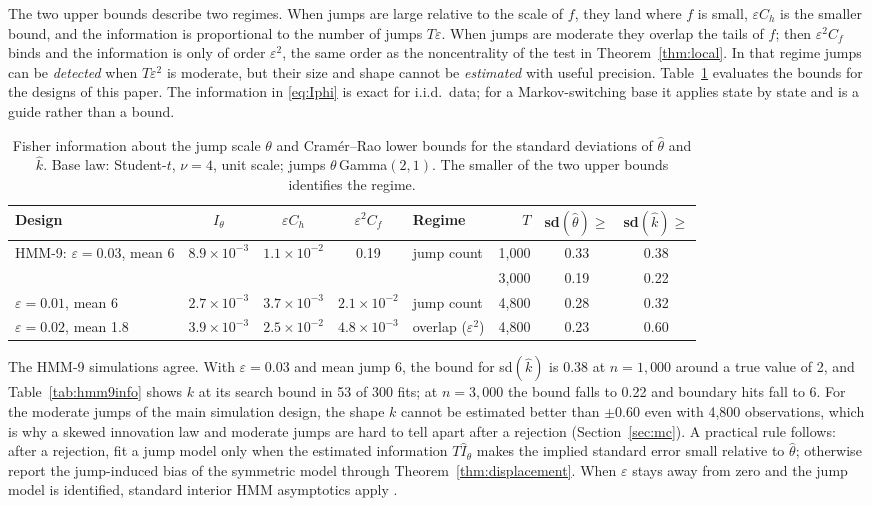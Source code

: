 \documentclass[11pt,a4paper]{article}
\theoremstyle{definition}
\theoremstyle{remark}
\begin{document}
\noindent The two upper bounds describe two regimes. When jumps are large relative to the scale of $f$, they land where $f$ is small, $\varepsilon C_h$ is the smaller bound, and the information is proportional to the number of jumps $T\varepsilon$. When jumps are moderate they overlap the tails of $f$; then $\varepsilon^2C_f$ binds and the information is only of order $\varepsilon^2$, the same order as the noncentrality of the test in Theorem~\ref{thm:local}. In that regime jumps can be \emph{detected} when $T\varepsilon^2$ is moderate, but their size and shape cannot be \emph{estimated} with useful precision. Table~\ref{tab:crb} evaluates the bounds for the designs of this paper. The information in \eqref{eq:Iphi} is exact for i.i.d.\ data; for a Markov-switching base it applies state by state and is a guide rather than a bound.

\begin{table}[ht]\centering\footnotesize\setlength{\tabcolsep}{4pt}
\caption{Fisher information about the jump scale $\theta$ and Cram\'er--Rao lower bounds for the standard deviations of $\hat\theta$ and $\hat k$. Base law: Student-$t$, $\nu=4$, unit scale; jumps $\theta\,$Gamma$(2,1)$. The smaller of the two upper bounds identifies the regime.}\label{tab:crb}
\begin{tabular}{lccclrcc}
\toprule
Design & $I_\theta$ & $\varepsilon C_h$ & $\varepsilon^2C_f$ & Regime & $T$ & sd$(\hat\theta)\ge$ & sd$(\hat k)\ge$\\
\midrule
HMM-9: $\varepsilon=0.03$, mean 6 & $8.9\times10^{-3}$ & $1.1\times10^{-2}$ & 0.19 & jump count & 1{,}000 & 0.33 & 0.38\\
 & & & & & 3{,}000 & 0.19 & 0.22\\
$\varepsilon=0.01$, mean 6 & $2.7\times10^{-3}$ & $3.7\times10^{-3}$ & $2.1\times10^{-2}$ & jump count & 4{,}800 & 0.28 & 0.32\\
$\varepsilon=0.02$, mean 1.8 & $3.9\times10^{-3}$ & $2.5\times10^{-2}$ & $4.8\times10^{-3}$ & overlap ($\varepsilon^2$) & 4{,}800 & 0.23 & 0.60\\
\bottomrule
\end{tabular}
\end{table}

\noindent The HMM-9 simulations agree. With $\varepsilon=0.03$ and mean jump 6, the bound for sd$(\hat k)$ is 0.38 at $n=1{,}000$ around a true value of 2, and Table~\ref{tab:hmm9info} shows $k$ at its search bound in 53 of 300 fits; at $n=3{,}000$ the bound falls to 0.22 and boundary hits fall to 6. For the moderate jumps of the main simulation design, the shape $k$ cannot be estimated better than $\pm0.60$ even with 4{,}800 observations, which is why a skewed innovation law and moderate jumps are hard to tell apart after a rejection (Section~\ref{sec:mc}). A practical rule follows: after a rejection, fit a jump model only when the estimated information $T\hat I_\theta$ makes the implied standard error small relative to $\hat\theta$; otherwise report the jump-induced bias of the symmetric model through Theorem~\ref{thm:displacement}. When $\varepsilon$ stays away from zero and the jump model is identified, standard interior HMM asymptotics apply \citep{douc2004}.
\end{document}
